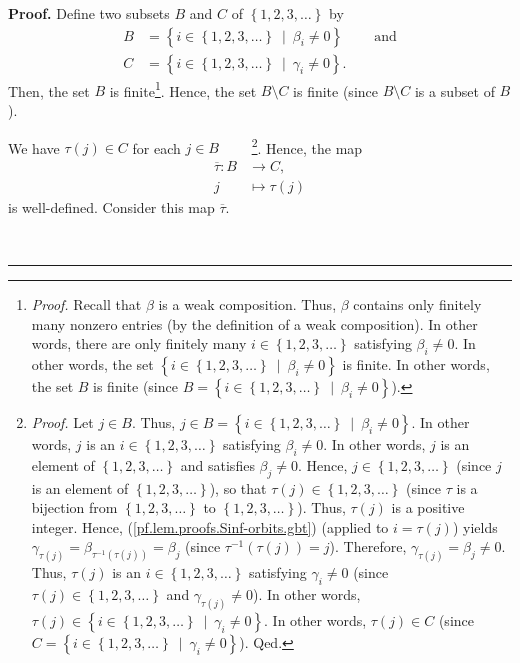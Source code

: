 \documentclass[numbers=enddot,12pt,final,onecolumn,notitlepage]{scrartcl}%
\theoremstyle{definition}
\newenvironment{proof}[1][Proof]{\noindent\textbf{#1.} }{\ \rule{0.5em}{0.5em}}
\newenvironment{verlong}{}{}
\begin{document}
\begin{verlong}
\begin{proof}
Define two subsets $B$ and $C$ of $\left\{  1,2,3,\ldots\right\}  $ by%
\begin{align*}
B  &  =\left\{  i\in\left\{  1,2,3,\ldots\right\}  \ \mid\ \beta_{i}%
\neq0\right\}  \ \ \ \ \ \ \ \ \ \ \text{and}\\
C  &  =\left\{  i\in\left\{  1,2,3,\ldots\right\}  \ \mid\ \gamma_{i}%
\neq0\right\}  .
\end{align*}
Then, the set $B$ is finite\footnote{\textit{Proof.} Recall that $\beta$ is a
weak composition. Thus, $\beta$ contains only finitely many nonzero entries
(by the definition of a weak composition). In other words, there are only
finitely many $i\in\left\{  1,2,3,\ldots\right\}  $ satisfying $\beta_{i}%
\neq0$. In other words, the set $\left\{  i\in\left\{  1,2,3,\ldots\right\}
\ \mid\ \beta_{i}\neq0\right\}  $ is finite. In other words, the set $B$ is
finite (since $B=\left\{  i\in\left\{  1,2,3,\ldots\right\}  \ \mid\ \beta
_{i}\neq0\right\}  $).}. Hence, the set $B\setminus C$ is finite (since
$B\setminus C$ is a subset of $B$).

We have $\tau\left(  j\right)  \in C$ for each $j\in B$%
\ \ \ \ \footnote{\textit{Proof.} Let $j\in B$. Thus, $j\in B=\left\{
i\in\left\{  1,2,3,\ldots\right\}  \ \mid\ \beta_{i}\neq0\right\}  $. In other
words, $j$ is an $i\in\left\{  1,2,3,\ldots\right\}  $ satisfying $\beta
_{i}\neq0$. In other words, $j$ is an element of $\left\{  1,2,3,\ldots
\right\}  $ and satisfies $\beta_{j}\neq0$. Hence, $j\in\left\{
1,2,3,\ldots\right\}  $ (since $j$ is an element of $\left\{  1,2,3,\ldots
\right\}  $), so that $\tau\left(  j\right)  \in\left\{  1,2,3,\ldots\right\}
$ (since $\tau$ is a bijection from $\left\{  1,2,3,\ldots\right\}  $ to
$\left\{  1,2,3,\ldots\right\}  $). Thus, $\tau\left(  j\right)  $ is a
positive integer. Hence, (\ref{pf.lem.proofs.Sinf-orbits.gbt}) (applied to
$i=\tau\left(  j\right)  $) yields $\gamma_{\tau\left(  j\right)  }%
=\beta_{\tau^{-1}\left(  \tau\left(  j\right)  \right)  }=\beta_{j}$ (since
$\tau^{-1}\left(  \tau\left(  j\right)  \right)  =j$). Therefore,
$\gamma_{\tau\left(  j\right)  }=\beta_{j}\neq0$. Thus, $\tau\left(  j\right)
$ is an $i\in\left\{  1,2,3,\ldots\right\}  $ satisfying $\gamma_{i}\neq0$
(since $\tau\left(  j\right)  \in\left\{  1,2,3,\ldots\right\}  $ and
$\gamma_{\tau\left(  j\right)  }\neq0$). In other words, $\tau\left(
j\right)  \in\left\{  i\in\left\{  1,2,3,\ldots\right\}  \ \mid\ \gamma
_{i}\neq0\right\}  $. In other words, $\tau\left(  j\right)  \in C$ (since
$C=\left\{  i\in\left\{  1,2,3,\ldots\right\}  \ \mid\ \gamma_{i}%
\neq0\right\}  $). Qed.}. Hence, the map
\begin{align*}
\overline{\tau}:B  &  \rightarrow C,\\
j  &  \mapsto\tau\left(  j\right)
\end{align*}
is well-defined. Consider this map $\overline{\tau}$.


\end{proof}
\end{verlong}
\end{document}
